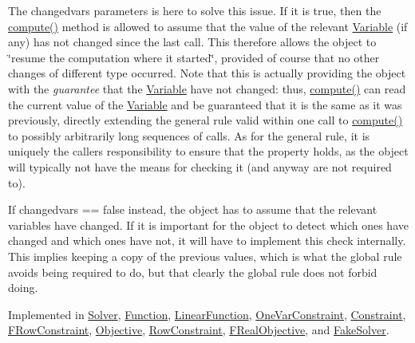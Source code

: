 The changedvars parameters is here to solve this issue. If it is true, then the \mbox{\hyperlink{class_s_m_spp__di__unipi__it_1_1_thin_compute_interface_a00fd6363d98ea46bcc273842b327d050}{compute()}} method is allowed to assume that the value of the relevant \mbox{\hyperlink{class_s_m_spp__di__unipi__it_1_1_variable}{Variable}} (if any) has not changed since the last call. This therefore allows the object to \char`\"{}resume the computation where it started\char`\"{}, provided of course that no other changes of different type occurred. Note that this is actually providing the object with the {\itshape guarantee} that the \mbox{\hyperlink{class_s_m_spp__di__unipi__it_1_1_variable}{Variable}} have not changed\+: thus, \mbox{\hyperlink{class_s_m_spp__di__unipi__it_1_1_thin_compute_interface_a00fd6363d98ea46bcc273842b327d050}{compute()}} can read the current value of the \mbox{\hyperlink{class_s_m_spp__di__unipi__it_1_1_variable}{Variable}} and be guaranteed that it is the same as it was previously, directly extending the general rule valid within one call to \mbox{\hyperlink{class_s_m_spp__di__unipi__it_1_1_thin_compute_interface_a00fd6363d98ea46bcc273842b327d050}{compute()}} to possibly arbitrarily long sequences of calls. As for the general rule, it is uniquely the caller\textquotesingle{}s responsibility to ensure that the property holds, as the object will typically not have the means for checking it (and anyway are not required to).

If changedvars == false instead, the object has to assume that the relevant variables have changed. If it is important for the object to detect which ones have changed and which ones have not, it will have to implement this check internally. This implies keeping a copy of the previous values, which is what the global rule avoids being required to do, but that clearly the global rule does not forbid doing. 

Implemented in \mbox{\hyperlink{class_s_m_spp__di__unipi__it_1_1_solver_a504d4e3e174c7a518cc66156a8a45ce5}{Solver}}, \mbox{\hyperlink{class_s_m_spp__di__unipi__it_1_1_function_a504d4e3e174c7a518cc66156a8a45ce5}{Function}}, \mbox{\hyperlink{class_s_m_spp__di__unipi__it_1_1_linear_function_afc8ff54ab05d22f4cca0fb0bfbeb7a49}{Linear\+Function}}, \mbox{\hyperlink{class_s_m_spp__di__unipi__it_1_1_one_var_constraint_afc8ff54ab05d22f4cca0fb0bfbeb7a49}{One\+Var\+Constraint}}, \mbox{\hyperlink{class_s_m_spp__di__unipi__it_1_1_constraint_a504d4e3e174c7a518cc66156a8a45ce5}{Constraint}}, \mbox{\hyperlink{class_s_m_spp__di__unipi__it_1_1_f_row_constraint_afc8ff54ab05d22f4cca0fb0bfbeb7a49}{F\+Row\+Constraint}}, \mbox{\hyperlink{class_s_m_spp__di__unipi__it_1_1_objective_a504d4e3e174c7a518cc66156a8a45ce5}{Objective}}, \mbox{\hyperlink{class_s_m_spp__di__unipi__it_1_1_row_constraint_a504d4e3e174c7a518cc66156a8a45ce5}{Row\+Constraint}}, \mbox{\hyperlink{class_s_m_spp__di__unipi__it_1_1_f_real_objective_afc8ff54ab05d22f4cca0fb0bfbeb7a49}{F\+Real\+Objective}}, and \mbox{\hyperlink{class_s_m_spp__di__unipi__it_1_1_fake_solver_afc8ff54ab05d22f4cca0fb0bfbeb7a49}{Fake\+Solver}}.


